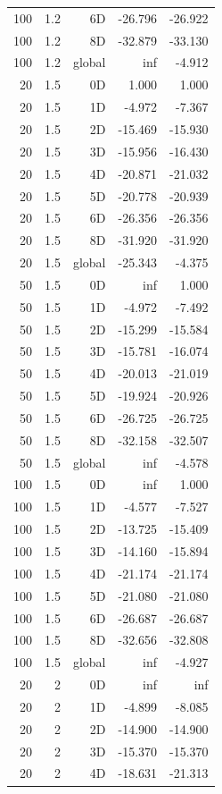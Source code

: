 \begin{longtable}{rrrrr}
100 & 1.2 & 6D & -26.796 & -26.922 \\
100 & 1.2 & 8D & -32.879 & -33.130 \\
100 & 1.2 & global & inf & -4.912 \\
20 & 1.5 & 0D & 1.000 & 1.000 \\
20 & 1.5 & 1D & -4.972 & -7.367 \\
20 & 1.5 & 2D & -15.469 & -15.930 \\
20 & 1.5 & 3D & -15.956 & -16.430 \\
20 & 1.5 & 4D & -20.871 & -21.032 \\
20 & 1.5 & 5D & -20.778 & -20.939 \\
20 & 1.5 & 6D & -26.356 & -26.356 \\
20 & 1.5 & 8D & -31.920 & -31.920 \\
20 & 1.5 & global & -25.343 & -4.375 \\
50 & 1.5 & 0D & inf & 1.000 \\
50 & 1.5 & 1D & -4.972 & -7.492 \\
50 & 1.5 & 2D & -15.299 & -15.584 \\
50 & 1.5 & 3D & -15.781 & -16.074 \\
50 & 1.5 & 4D & -20.013 & -21.019 \\
50 & 1.5 & 5D & -19.924 & -20.926 \\
50 & 1.5 & 6D & -26.725 & -26.725 \\
50 & 1.5 & 8D & -32.158 & -32.507 \\
50 & 1.5 & global & inf & -4.578 \\
100 & 1.5 & 0D & inf & 1.000 \\
100 & 1.5 & 1D & -4.577 & -7.527 \\
100 & 1.5 & 2D & -13.725 & -15.409 \\
100 & 1.5 & 3D & -14.160 & -15.894 \\
100 & 1.5 & 4D & -21.174 & -21.174 \\
100 & 1.5 & 5D & -21.080 & -21.080 \\
100 & 1.5 & 6D & -26.687 & -26.687 \\
100 & 1.5 & 8D & -32.656 & -32.808 \\
100 & 1.5 & global & inf & -4.927 \\
20 & 2 & 0D & inf & inf \\
20 & 2 & 1D & -4.899 & -8.085 \\
20 & 2 & 2D & -14.900 & -14.900 \\
20 & 2 & 3D & -15.370 & -15.370 \\
20 & 2 & 4D & -18.631 & -21.313 \\

\end{longtable}
